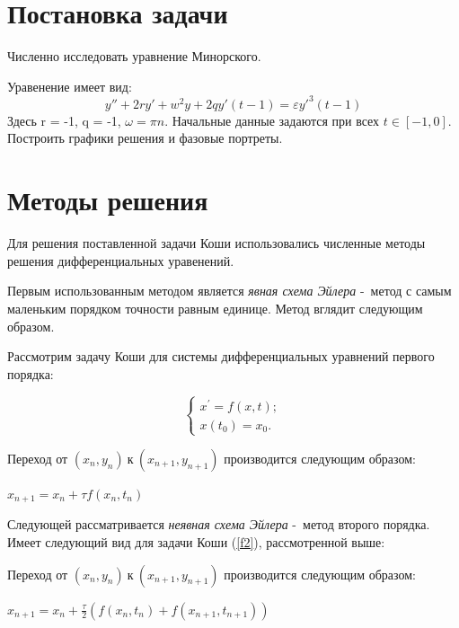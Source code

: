 \documentclass[a4paper,12pt]{article}
\begin{document}
    \newpage 
	\tableofcontents
	\setcounter{page}{3}

	\newpage
	\section{Постановка задачи}
	Численно исследовать уравнение Минорского.

    Уравенение имеет вид:
    \begin{equation}
    y'' + 2ry' + w^2y + 2qy'(t - 1) = \varepsilon y'^3(t - 1)
	\label{f1}
    \end{equation}
    Здесь r = -1, q = -1, \(\omega = \pi n\). Начальные данные задаются при всех
    \(t \in [-1, 0 ]\). Построить графики решения и фазовые портреты.
	
    \section{Методы решения}
	Для решения поставленной задачи Коши использовались численные методы решения 
	дифференциальных уравенений.

	Первым использованным методом является \textit{явная схема Эйлера} -~метод с самым 
	маленьким порядком точности равным единице.
	Метод вглядит следующим образом.

	Рассмотрим задачу Коши для системы дифференциальных уравнений первого
	порядка:

	\begin{equation}
		\begin{cases}
			x^\prime = f(x, t); \\
			x(t_0) = x_0.
		\end{cases}
		\label{f2}
	\end{equation}

	Переход от $(x_n, y_n)~\text{к}~(x_{n+1}, y_{n+1})$
	производится следующим образом:

	\begin{center}
	$x_{n+1} = x_n + \tau f(x_n, t_n)$
	\end{center}

	Следующей рассматривается \textit{неявная схема Эйлера} -~метод второго порядка.
	Имеет следующий вид для задачи Коши (\ref{f2}), рассмотренной выше:
	
	Переход от $(x_n, y_n)~\text{к}~(x_{n+1}, y_{n+1})$
	производится следующим образом:

	\begin{center}
	$x_{n+1} = x_n + \frac{\tau}{2} (f(x_n, t_n) + f(x_{n+1}, t_{n+1}))$
	\end{center}
\end{document}
